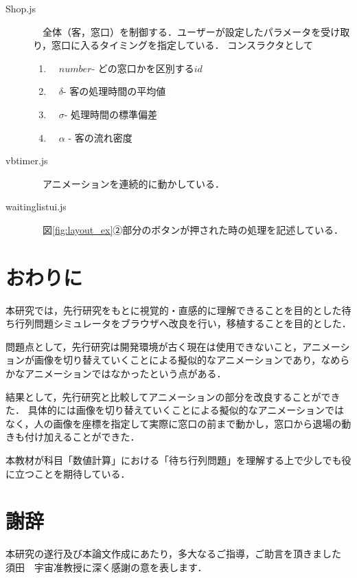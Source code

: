 \documentclass[12pt,a4j]{ltjsarticle}
\begin{document}
\begin{description}
  \item[Shop.js]　全体（客，窓口）を制御する．ユーザーが設定したパラメータを受け取り，窓口に入るタイミングを指定している．
  コンスラクタとして
  \begin{enumerate}[label=(\alph*)]
	\item　$number$- どの窓口かを区別する$id$
	\item　$\delta$- 客の処理時間の平均値
	\item　$\sigma$- 処理時間の標準偏差
	\item　$\alpha$ - 客の流れ密度
\end{enumerate}
\vspace{10mm}

  \item[vbtimer.js]　アニメーションを連続的に動かしている．
  \vspace{10mm}
  
  \item[waitinglistui.js]　図\ref{fig:layout_ex}②部分のボタンが押された時の処理を記述している．
\end{description}

\clearpage

\section{おわりに}
本研究では，先行研究をもとに視覚的・直感的に理解できることを目的とした待ち行列問題シミュレータをブラウザへ改良を行い，移植することを目的とした．

問題点として，先行研究は開発環境が古く現在は使用できないこと，アニメーションが画像を切り替えていくことによる擬似的なアニメーションであり，なめらかなアニメーションではなかったという点がある．

結果として，先行研究と比較してアニメーションの部分を改良することができた．
具体的には画像を切り替えていくことによる擬似的なアニメーションではなく，人の画像を座標を指定して実際に窓口の前まで動かし，窓口から退場の動きも付け加えることができた．

本教材が科目「数値計算」における「待ち行列問題」を理解する上で少しでも役に立つことを期待している．

\clearpage

\section{謝辞}
本研究の遂行及び本論文作成にあたり，多大なるご指導，ご助言を頂きました  須田　宇宙准教授に深く感謝の意を表します．
\clearpage
\end{document}
